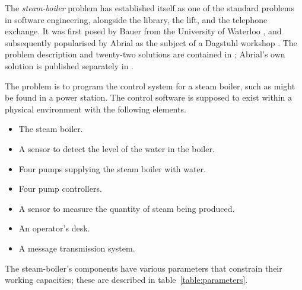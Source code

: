 \documentclass{report}
\newcommand{\compresslist}{\itemsep=0pt \parskip=0pt}
\begin{document}
The \emph{steam-boiler} problem has established itself as one of the
standard problems in software engineering, alongside the library, the
lift, and the telephone exchange.  It was first posed by Bauer from
the University of Waterloo \cite{bauer-93}, and subsequently
popularised by Abrial as the subject of a Dagstuhl workshop
\cite{abrial-96-b}.  The problem description and twenty-two solutions
are contained in \cite{abrial-borger-langmaack-96}; Abrial's own
solution is published separately in \cite{abrial-96-a}.

The problem is to program the control system for a steam boiler, such
as might be found in a power station.  The control software is
supposed to exist within a physical environment with the following
elements.
{\slshape
  \begin{itemize}\compresslist
  \item The steam boiler.
  \item A sensor to detect the level of the water in the boiler.
  \item Four pumps supplying the steam boiler with water.
  \item Four pump controllers.
  \item A sensor to measure the quantity of steam being produced.
  \item An operator's desk.
  \item A message transmission system.
  \end{itemize}
}
The steam-boiler's components have various parameters that constrain
their working capacities; these are described in
table~\ref{table:parameters}.
\end{document}
